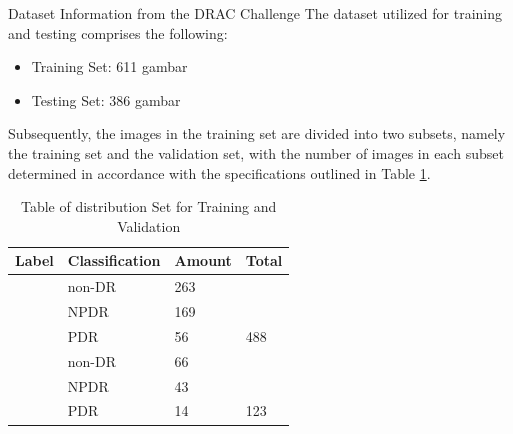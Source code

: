 Dataset Information from the DRAC Challenge
The dataset utilized for training and testing comprises the following:

	\begin{itemize}
		\item Training Set: 611 gambar
		\item Testing Set: 386 gambar
	\end{itemize}
Subsequently, the images in the training set are divided into two subsets, namely the training set and the validation set, with the number of images in each subset determined in accordance with the specifications outlined in Table \ref{table:Datasettraining}.
\begin{table}[hbtp]
	\begin{center}
	\caption{Table of distribution Set for Training and Validation}
	\label{table:Datasettraining}
	\begin{tabular}{|l|l|l|l|}
		\hline
		\rowcolor[HTML]{C0C0C0} 
		Label                                                & Classification & Amount & Total                                         \\ \hline
		\rowcolor[HTML]{FFFFFF} 
		\cellcolor[HTML]{FFFFFF}                             & non-DR      & 263    & \cellcolor[HTML]{FFFFFF}                      \\ \cline{2-3}
		\rowcolor[HTML]{FFFFFF} 
		\cellcolor[HTML]{FFFFFF}                             & NPDR        & 169    & \cellcolor[HTML]{FFFFFF}                      \\ \cline{2-3}
		\rowcolor[HTML]{FFFFFF} 
		\multirow{-3}{*}{\cellcolor[HTML]{FFFFFF}Training}   & PDR         & 56     & \multirow{-3}{*}{\cellcolor[HTML]{FFFFFF}488} \\ \hline
		\rowcolor[HTML]{FFFFFF} 
		\cellcolor[HTML]{FFFFFF}                             & non-DR      & 66     & \cellcolor[HTML]{FFFFFF}                      \\ \cline{2-3}
		\rowcolor[HTML]{FFFFFF} 
		\cellcolor[HTML]{FFFFFF}                             & NPDR        & 43     & \cellcolor[HTML]{FFFFFF}                      \\ \cline{2-3}
		\rowcolor[HTML]{FFFFFF} 
		\multirow{-3}{*}{\cellcolor[HTML]{FFFFFF}Validation} & PDR         & 14     & \multirow{-3}{*}{\cellcolor[HTML]{FFFFFF}123} \\ \hline
		\end{tabular}
	\end{center}
\end{table}

